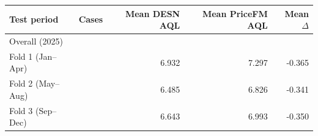 \begingroup
\TableStyle
\begin{tabular*}{\linewidth}{@{\extracolsep{\fill}}lrrrr@{}}
\toprule
Test period & Cases & Mean DESN AQL & Mean PriceFM AQL & Mean \(\Delta\) \\
\midrule
Overall (2025) & \PricefmFullRegionFolds{} & \PricefmFullMeanSelectedAql{} & \PricefmFullMeanPricefmAql{} & \PricefmFullMeanDeltaAql{} \\
Fold 1 (Jan--Apr) & \PricefmFullRegions{} & 6.932 & 7.297 & -0.365 \\
Fold 2 (May--Aug) & \PricefmFullRegions{} & 6.485 & 6.826 & -0.341 \\
Fold 3 (Sep--Dec) & \PricefmFullRegions{} & 6.643 & 6.993 & -0.350 \\
\bottomrule
\end{tabular*}
\endgroup
